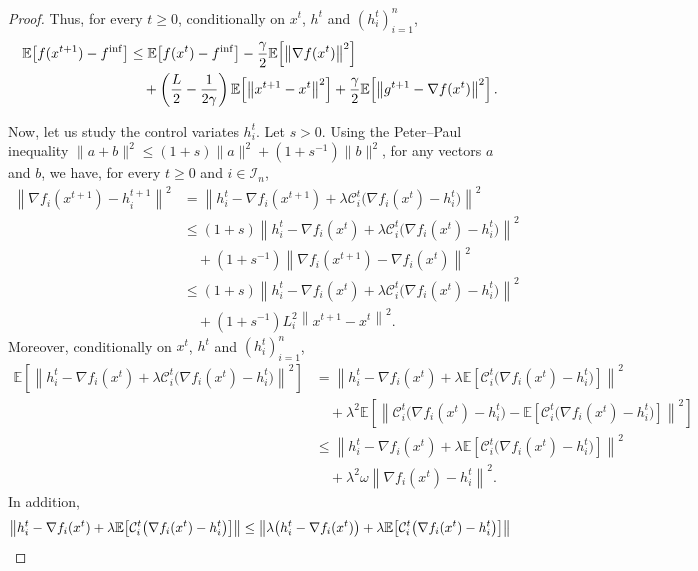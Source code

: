 \documentclass{article} %
\theoremstyle{plain}
\theoremstyle{definition}
\theoremstyle{remark}
\newcommand{\sqnorm}[1]{\left\| #1 \right\|^2}
\newcommand{\Exp}[1]{\mathbb{E}\!\left[ #1 \right]}
\begin{document}
\begin{proof}
   Thus, for every $t\geq 0$, conditionally on $x^t$, $h^t$ and $(h_i^t)_{i=1}^n$,
    \begin{align*}
   \Exp{f(x^{t+1}) -f^{\inf}} &\leq \Exp{f(x^t)  -f^{\inf}} -\frac{\gamma}{2} \Exp{\sqnorm{\nabla f(x^t)}}\notag\\
   &\quad+ \left(\frac{ L}{2}-\frac{1}{2\gamma}\right)\Exp{\sqnorm{x^{t+1}-x^t}}  + \frac{ \gamma }{2}\Exp{\sqnorm{g^{t+1}-\nabla f(x^t)}} .\notag
   \end{align*}
   
   Now, let us study the control variates $h_i^t$. Let $s>0$. Using the Peter--Paul inequality $\|a+b\|^2 \leq (1+s) \|a\|^2 + (1+s^{-1}) \|b\|^2$, for any vectors $a$ and $b$, 
   we have, for every $t\geq 0$ and $i\in\mathcal{I}_n$,
   \begin{align*}
   \sqnorm{\nabla f_i(x^{t+1})-h_i^{t+1}}&=\sqnorm{h_i^{t}-\nabla f_i(x^{t+1}) +\lambda \mathcal{C}_i^t\big(\nabla f_i(x^t)-h_i^t\big)  }\\
   &\leq (1+s)\sqnorm{h_i^{t}-\nabla f_i(x^{t}) +\lambda \mathcal{C}_i^t\big(\nabla f_i(x^t)-h_i^t\big)  }\\ 
   &\quad+(1+s^{-1})\sqnorm{\nabla f_i(x^{t+1})-\nabla f_i(x^{t})}\\
   &\leq (1+s)\sqnorm{h_i^{t}-\nabla f_i(x^{t}) +\lambda \mathcal{C}_i^t\big(\nabla f_i(x^t)-h_i^t\big)  } \\
   &\quad+(1+s^{-1})L_i^2\sqnorm{x^{t+1}-x^{t}}.
   \end{align*}
   Moreover,  conditionally on $x^t$, $h^t$ and $(h_i^t)_{i=1}^n$, 
   \begin{align*}
   \Exp{\sqnorm{h_i^{t}-\nabla f_i(x^{t}) +\lambda \mathcal{C}_i^t\big(\nabla f_i(x^t)-h_i^t\big)  }}&=\sqnorm{h_i^{t}-\nabla f_i(x^{t}) +\lambda \Exp{\mathcal{C}_i^t\big(\nabla f_i(x^t)-h_i^t\big)} }\\
   &\quad+\lambda^2\Exp{\sqnorm{ \mathcal{C}_i^t\big(\nabla f_i(x^t)-h_i^t\big)-\Exp{ \mathcal{C}_i^t\big(\nabla f_i(x^t)-h_i^t\big) }  }}\\
   &\leq\sqnorm{h_i^{t}-\nabla f_i(x^{t}) +\lambda \Exp{\mathcal{C}_i^t\big(\nabla f_i(x^t)-h_i^t\big)} }\\
   &\quad+\lambda^2\omega \sqnorm{\nabla f_i(x^t)-h_i^t}.
   \end{align*}
   In addition,
   \begin{align*}
   \left\|h_i^{t}-\nabla f_i(x^{t}) +\lambda \Exp{\mathcal{C}_i^t\big(\nabla f_i(x^t)-h_i^t\big)}\right\|& \leq \left\|\lambda\big(h_i^{t}-\nabla f_i(x^{t})\big) +\lambda \Exp{\mathcal{C}_i^t\big(\nabla f_i(x^t)-h_i^t\big)}\right\|\notag\\

\end{align*}
\end{proof}
\end{document}
